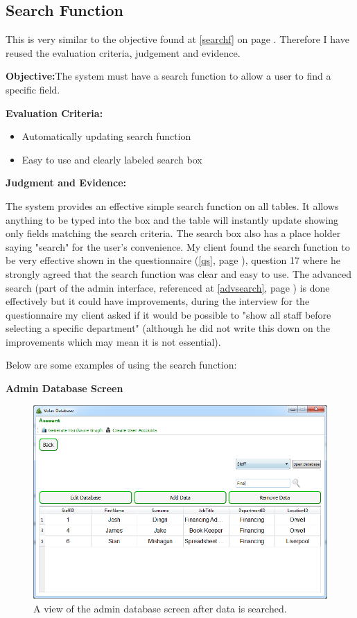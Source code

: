 \subsection{Search Function}

This is very similar to the objective found at \ref{searchf} on page \pageref{searchf}. Therefore I have reused the evaluation criteria, judgement and evidence.

\textbf{Objective:}The system must have a search function to allow a user to find a specific field.

\textbf{Evaluation Criteria:}
\begin{itemize}
\item{Automatically updating search function}
\item{Easy to use and clearly labeled search box}
\end{itemize}

\textbf{Judgment and Evidence:}

The system provides an effective simple search function on all tables. It allows anything to be typed into the box and the table will instantly update showing only fields matching the search criteria. The search box also has a place holder saying "search" for the user's convenience. My client found the search function to be very effective shown in the questionnaire (\ref{qs}, page \pageref{qs}), question 17 where he strongly agreed that the search function was clear and easy to use. The advanced search (part of the admin interface, referenced at \ref{advsearch}, page \pageref{advsearch}) is done effectively but it could have improvements, during the interview for the questionnaire my client asked if it would be possible to "show all staff before selecting a specific department" (although he did not write this down on the improvements which may mean it is not essential).

Below are some examples of using the search function:

\textbf{Admin Database Screen}

\begin{figure}[H]
    \includegraphics[width=\textwidth]{./Evaluation/Images/afteradminsearch.png}
    \caption{A view of the admin database screen after data is searched.} 
\end{figure}

